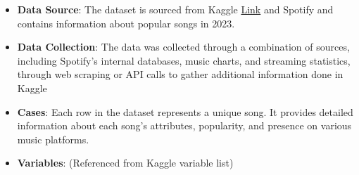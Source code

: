 \documentclass[
]{article}
\begin{document}
\begin{itemize}
\item
  \textbf{Data Source}: The dataset is sourced from Kaggle
  \href{https://www.kaggle.com/datasets/nelgiriyewithana/top-spotify-songs-2023/data}{Link}
  and Spotify and contains information about popular songs in 2023.
\item
  \textbf{Data Collection}: The data was collected through a combination
  of sources, including Spotify's internal databases, music charts, and
  streaming statistics, through web scraping or API calls to gather
  additional information done in Kaggle
\item
  \textbf{Cases}: Each row in the dataset represents a unique song. It
  provides detailed information about each song's attributes,
  popularity, and presence on various music platforms.
\item
  \textbf{Variables}: (Referenced from Kaggle variable list)


\end{itemize}
\end{document}
